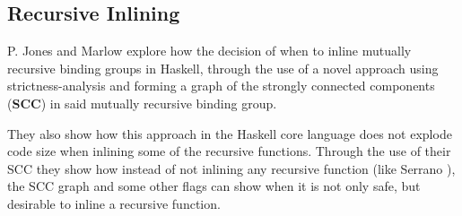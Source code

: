 \subsection{Recursive Inlining}

P. Jones and Marlow \cite{GHC-paper} explore how the decision of when to inline
mutually recursive binding groups in Haskell, through the use of a novel
approach using strictness-analysis and forming a graph of the strongly connected
components (\textbf{SCC}) in said mutually recursive binding group.

They also show how this approach in the Haskell core language does not explode
code size when inlining some of the recursive functions. Through the use of
their SCC they show how instead of not inlining any recursive function (like
Serrano \cite{InlineWhenHowSerrano}), the SCC graph and some other flags can
show when it is not only safe, but desirable to inline a recursive function.
